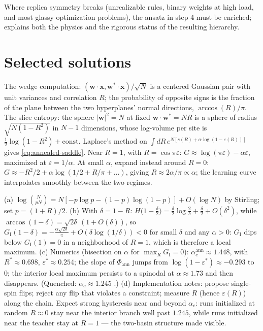 \documentclass[11pt]{article}
\newcommand{\bv}[1]{\boldsymbol{#1}}
\begin{document}
Where replica symmetry breaks (unrealizable rules, binary weights at high
load, and most glassy optimization problems), the ansatz in step 4 must be
enriched; \cite{zdeborova2016statistical} explains both the physics and the
rigorous status of the resulting hierarchy.

\section*{Selected solutions}

\begin{solution}[ex:annealed]
The wedge computation: $(\bv{w}\cdot\bv{x},\bv{w}^*\cdot\bv{x})/\sqrt{N}$
is a centered Gaussian pair with unit variances and correlation $R$; the
probability of opposite signs is the fraction of the plane between the two
hyperplanes' normal directions, $\arccos(R)/\pi$. The slice entropy: the
sphere $|\bv{w}|^2 = N$ at fixed $\bv{w}\cdot\bv{w}^* = NR$ is a sphere of
radius $\sqrt{N(1-R^2)}$ in $N-1$ dimensions, whose log-volume per site is
$\tfrac12\log(1-R^2) + \text{const}$. Laplace's method on
$\int dR\, e^{N[s(R) + \alpha\log(1-\varepsilon(R))]}$ gives
\cref{eq:annealed-saddle}. Near $R = 1$, with $R = \cos\pi\varepsilon$:
$G \approx \log(\pi\varepsilon) - \alpha\varepsilon$, maximized at
$\varepsilon = 1/\alpha$. At small $\alpha$, expand instead around $R = 0$:
$G \approx -R^2/2 + \alpha\log(1/2 + R/\pi + \dots)$, giving
$R \approx 2\alpha/\pi \propto \alpha$; the learning curve interpolates
smoothly between the two regimes.
\end{solution}

\begin{solution}[ex:ising]
(a) $\log\binom{N}{pN} = N[-p\log p - (1-p)\log(1-p)] + O(\log N)$ by
Stirling; set $p = (1+R)/2$.
(b) With $\delta = 1 - R$: $H\bigl(1 - \tfrac{\delta}{2}\bigr) =
\tfrac{\delta}{2}\log\tfrac{2}{\delta} + \tfrac{\delta}{2} + O(\delta^2)$,
while $\arccos(1 - \delta) = \sqrt{2\delta}\,(1 + O(\delta))$, so
$G_{\mathrm{I}}(1 - \delta) = -\tfrac{\alpha\sqrt{2\delta}}{\pi}
+ O(\delta\log(1/\delta)) < 0$ for small $\delta$ and any $\alpha > 0$:
$G_{\mathrm{I}}$ dips below $G_{\mathrm{I}}(1) = 0$ in a neighborhood of
$R = 1$, which is therefore a local maximum.
(c) Numerics (bisection on $\alpha$ for $\max_R G_{\mathrm{I}} = 0$):
$\alpha_c^{\mathrm{ann}} \approx 1.448$, with $R^* \approx 0.698$,
$\varepsilon^* \approx 0.254$; the slope of $\Phi_{\mathrm{ann}}$ jumps
from $\log(1 - \varepsilon^*) \approx -0.293$ to $0$; the interior local
maximum persists to a spinodal at $\alpha \approx 1.73$ and then
disappears. (Quenched: $\alpha_c \approx 1.245$
\cite{gyorgyi1990first}.)
(d) Implementation notes: propose single-spin flips; reject any flip that
violates a constraint; measure $R$ (hence $\varepsilon(R)$) along the
chain. Expect strong hysteresis near and beyond $\alpha_c$: runs
initialized at random $R \approx 0$ stay near the interior branch well
past $1.245$, while runs initialized near the teacher stay at $R = 1$ ---
the two-basin structure made visible.
\end{solution}
\end{document}
